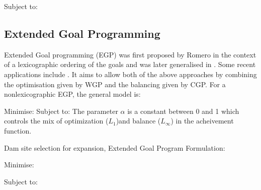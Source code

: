 Subject to:
            \EqDamHeightConstraintTwelve
            \EqDamCapacityConstraintThirteen
            \EqReservoirAreaConstraintFourteen
            \EqTemperatureConstraintFifteen
            \EqPopulationConstraintSixteen
            \EqRainfallConstraintSeventeen
            \EqResidenceConstraintEighteen
            \EqFarmlandDistanceConstraintNineteen
            \EqNearestRoadConstraintTwenty
            \EqFarmlandAreaConstraintTwentyOne
            \EqSelectThreeDamsTwentyTwo
            \EqBudgetConstraintTwentyThree
            \EqDConstraintOneNTwentyFour
            \EqDConstraintTwoNTwentyFive
            \EqDConstraintThreeNTwentySix
            \EqDConstraintFourNTwentySix
            \EqDConstraintFiveNTwentySeven
            \EqDConstraintSixNTwentyEight
            \EqDConstraintSevenNTwentyNine
            \EqDConstraintEightNThirty
            \EqDConstraintNineNThirtyOne
            \EqDConstraintTenNThirtyTwo

\subsection{Extended Goal Programming}  
Extended Goal programming (EGP) was first proposed by Romero \cite{ROMERO2001} in the context of a lexicographic ordering of the goals and was later generalised in \cite{ROMERO2004}. Some recent applications include \cite{Guijarro2018,Pal2014}. It aims to allow both of the above approaches by combining the optimisation given by WGP and the balancing given by CGP. For a nonlexicographic EGP, the general model is:


Minimise:
            \EqEGPMinFunctionTen
Subject to:
            \EqGGPMinFunctionSubTwo
            \EqCGPConstraintSeven
            \EqCGPConstraintEight
            \EqGGPMinFunctionSubFour
            \EqCGPConstraintNine
The parameter $\alpha$ is a constant between 0 and 1 which controls the mix of optimization ($L_1$)and balance ($L_\infty$) in the acheivement function.

Dam site selection for expansion, Extended Goal Program Formulation:

Minimise:
        \EqEGPObjectiveThirtyThree

Subject to:
            \EqDamHeightConstraintTwelve
            \EqDamCapacityConstraintThirteen
            \EqReservoirAreaConstraintFourteen
            \EqTemperatureConstraintFifteen
            \EqPopulationConstraintSixteen
            \EqRainfallConstraintSeventeen
            \EqResidenceConstraintEighteen
            \EqFarmlandDistanceConstraintNineteen
            \EqNearestRoadConstraintTwenty
            \EqFarmlandAreaConstraintTwentyOne
            \EqSelectThreeDamsTwentyTwo
            \EqBudgetConstraintTwentyThree
            \EqDConstraintOneNTwentyFour
            \EqDConstraintTwoNTwentyFive
            \EqDConstraintThreeNTwentySix
            \EqDConstraintFourNTwentySix
            \EqDConstraintFiveNTwentySeven
            \EqDConstraintSixNTwentyEight
            \EqDConstraintSevenNTwentyNine
            \EqDConstraintEightNThirty
            \EqDConstraintNineNThirtyOne
            \EqDConstraintTenNThirtyTwo


